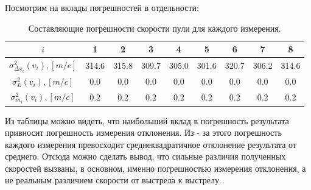 \documentclass[11pt]{article}
\begin{document}
\begin{enumerate}
        Посмотрим на вклады погрешностей в отдельности:

        \begin{table}[h]
                    \caption{Составляющие погрешности скорости пули для каждого измерения.}
                    \begin{center}
                    \begin{tabular}{|c|c|c|c|c|c|c|c|c|}
                            \hline 
                                $i$ & 1 & 2 & 3 & 4 & 5 & 6 & 7 & 8 \\
                            \hline
                                $\sigma^2_{\Delta x_i}(v_i) , [m/c]$ 
                                &314.6&315.8&309.7&305.0&301.6&320.7&306.2&314.6\\
                            \hline
                                $\sigma^2_{L}(v_i) , [m/c]$  &0.0&0.0&0.0&0.0&0.0&0.0&0.0&0.0 \\
                            \hline
                                $\sigma^2_{m_i}(v_i) , [m/c]$ &0.2&0.2&0.2&0.2&0.2&0.2&0.2&0.2 \\
                            \hline
                            \end{tabular}
                        \end{center}
        \end{table}


        Из таблицы можно видеть, что наибольший вклад в погрешность результата привносит погрешность измерения отклонения. Из - за этого погрешность каждого измерения превосходит среднеквадратичное отклонение результата от среднего. Отсюда можно сделать вывод, что сильные различия полученных скоростей вызваны, в основном, именно погрешностью измерения отклонения, а не реальным различием скорости от выстрела к выстрелу.

    \end{enumerate}
\end{document}

